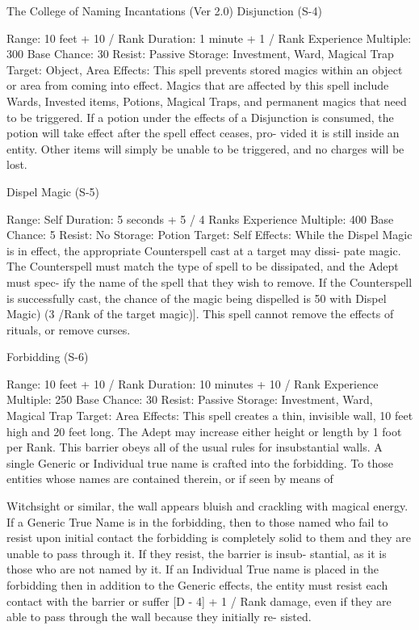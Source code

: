 \begin{Chapter}{The College of Naming Incantations (Ver 2.0)}
Disjunction (S-4) 

Range: 10 feet + 10 / Rank 
Duration: 1 minute + 1 / Rank 
Experience Multiple: 300 
Base Chance: 30%
Resist: Passive 
Storage: Investment, Ward, Magical Trap 
Target: Object, Area 
Effects: This spell prevents stored magics within an 
object or area from coming into effect. Magics that 
are  affected  by  this  spell  include  Wards,  Invested 
items,  Potions,  Magical  Traps,  and  permanent 
magics that need to be triggered.  If a potion under 
the effects of a Disjunction is consumed, the potion 
will  take  effect  after  the  spell  effect  ceases,  pro-
vided  it  is  still  inside  an  entity.  Other  items  will 
simply  be  unable  to  be  triggered,  and  no  charges 
will be lost. 

Dispel Magic (S-5) 

Range: Self 
Duration: 5 seconds + 5 / 4 Ranks 
Experience Multiple: 400 
Base Chance: 5%
Resist: No 
Storage: Potion 
Target: Self 
Effects:  While  the  Dispel  Magic  is  in  effect,  the 
appropriate Counterspell cast at a target may dissi-
pate magic. The Counterspell must match the  type 
of spell to be dissipated, and the Adept must spec-
ify the name of the spell that they wish to remove. 
If the Counterspell is successfully cast, the chance 
of  the  magic  being  dispelled  is  50%
with Dispel Magic) (3 /Rank of the target magic)]. 
This  spell  cannot  remove  the  effects  of  rituals,  or 
remove curses. 

Forbidding (S-6) 

Range: 10 feet + 10 / Rank 
Duration: 10 minutes + 10 / Rank 
Experience Multiple: 250 
Base Chance: 30%
Resist: Passive 
Storage: Investment, Ward, Magical Trap 
Target: Area 
Effects: This spell creates a thin, invisible wall, 10 
feet high and 20 feet long. The Adept may increase 
either  height  or  length  by  1  foot  per  Rank.  This 
barrier obeys all of the usual rules for insubstantial 
walls.  A  single  Generic  or  Individual  true name  is 
crafted into the forbidding. To those entities whose 
names are contained therein, or if seen by means of 

Witchsight  or  similar,  the  wall  appears  bluish  and 
crackling  with  magical  energy.  If  a  Generic  True 
Name  is  in  the  forbidding,  then  to  those  named 
who fail to resist upon initial contact the forbidding 
is completely solid to them and they  are unable to 
pass through  it.  If  they  resist,  the  barrier  is  insub-
stantial, as it is those who are not named by it. If an 
Individual  True  name  is  placed  in  the  forbidding 
then  in  addition  to  the  Generic  effects,  the  entity 
must  resist  each  contact  with  the  barrier  or  suffer 
[D - 4] + 1 / Rank damage, even if they are able to 
pass  through  the  wall  because  they  initially  re-
sisted. 


\end{Chapter}
